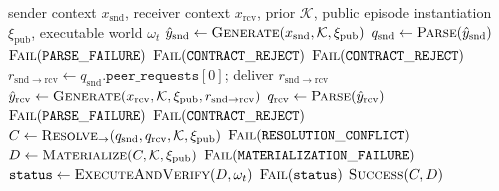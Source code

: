 \documentclass[10pt]{article}
\newcommand{\artifact}[1]{\texttt{#1}}
\begin{document}
\begin{algorithm}[!htbp]
  \caption{Forward resolution}
  \label{alg:forward}
  \footnotesize
  \begin{algorithmic}[1]
    \Require sender context $x_{\mathrm{snd}}$, receiver context $x_{\mathrm{rcv}}$, prior $\mathcal K$, public episode instantiation $\xi_{\mathrm{pub}}$, executable world $\omega_t$
    \State $\hat y_{\mathrm{snd}} \gets \textsc{Generate}(x_{\mathrm{snd}},\mathcal K,\xi_{\mathrm{pub}})$ \Comment{\artifact{SELF+REQ}}
    \State $q_{\mathrm{snd}} \gets \textsc{Parse}(\hat y_{\mathrm{snd}})$
     \State \Return $\textsc{Fail}(\mathtt{PARSE\_FAILURE})$ \EndIf
      \State \Return $\textsc{Fail}(\mathtt{CONTRACT\_REJECT})$
    \EndIf
      \State \Return $\textsc{Fail}(\mathtt{CONTRACT\_REJECT})$
    \EndIf
    \State $r_{\mathrm{snd}\rightarrow\mathrm{rcv}}\gets q_{\mathrm{snd}}.\mathtt{peer\_requests}[0]$; deliver $r_{\mathrm{snd}\rightarrow\mathrm{rcv}}$
    \State $\hat y_{\mathrm{rcv}} \gets \textsc{Generate}(x_{\mathrm{rcv}},\mathcal K,\xi_{\mathrm{pub}},r_{\mathrm{snd}\rightarrow\mathrm{rcv}})$
    \State $q_{\mathrm{rcv}} \gets \textsc{Parse}(\hat y_{\mathrm{rcv}})$
     \State \Return $\textsc{Fail}(\mathtt{PARSE\_FAILURE})$ \EndIf
      \State \Return $\textsc{Fail}(\mathtt{CONTRACT\_REJECT})$
    \EndIf
    \State $C \gets \textsc{Resolve}_{\rightarrow}(q_{\mathrm{snd}},q_{\mathrm{rcv}},\mathcal K,\xi_{\mathrm{pub}})$
     \State \Return $\textsc{Fail}(\mathtt{RESOLUTION\_CONFLICT})$ \EndIf
    \State $D \gets \textsc{Materialize}(C,\mathcal K,\xi_{\mathrm{pub}})$
     \State \Return $\textsc{Fail}(\mathtt{MATERIALIZATION\_FAILURE})$ \EndIf
    \State $\mathtt{status}\gets\textsc{ExecuteAndVerify}(D,\omega_t)$
     \State \Return $\textsc{Fail}(\mathtt{status})$ \EndIf
    \State \Return $\textsc{Success}(C,D)$
  \end{algorithmic}
\end{algorithm}
\end{document}
